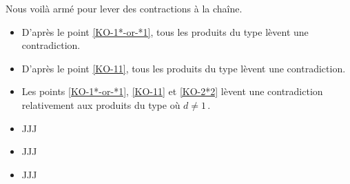 \smallskip

Nous voilà armé pour lever des contractions à la chaîne.
%
\begin{itemize}
	\item D'après le point \ref{KO-1*-or-*1}, tous les produits du type  lèvent une contradiction.
	


	\item D'après le point \ref{KO-11}, tous les produits du type  lèvent une contradiction.
	


	\item Les points \ref{KO-1*-or-*1}, \ref{KO-11} et \ref{KO-2*2} lèvent une contradiction relativement aux produits du type  où $d \neq 1$\,.
	


	\item JJJ
	


	\item JJJ
	


	\item JJJ
	
\end{itemize}



